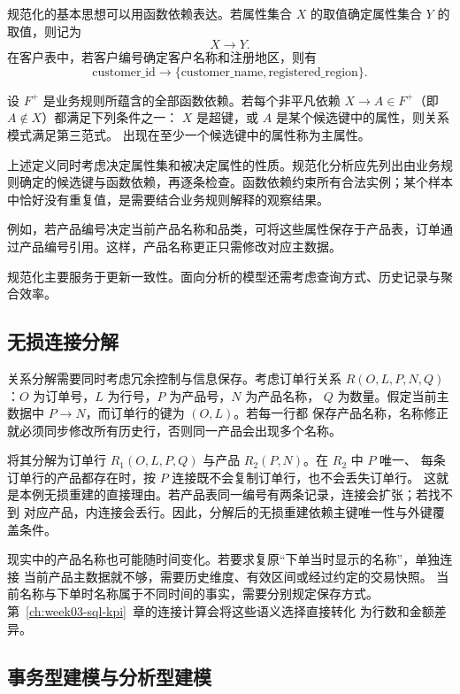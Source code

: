 规范化的基本思想可以用函数依赖表达。若属性集合 \(X\) 的取值确定属性集合 \(Y\) 的取值，则记为
\[
X\rightarrow Y.
\]
在客户表中，若客户编号确定客户名称和注册地区，则有
\[
\text{customer\_id}\rightarrow
\{\text{customer\_name},\text{registered\_region}\}.
\]

\begin{definition}[第三范式]
设 \(F^+\) 是业务规则所蕴含的全部函数依赖。若每个非平凡依赖
\(X\to A\in F^+\)（即 \(A\notin X\)）都满足下列条件之一：
\(X\) 是超键，或 \(A\) 是某个候选键中的属性，则关系模式满足第三范式。
出现在至少一个候选键中的属性称为主属性。
\end{definition}

上述定义同时考虑决定属性集和被决定属性的性质。规范化分析应先列出由业务规则确定的候选键与函数依赖，再逐条检查。函数依赖约束所有合法实例；某个样本中恰好没有重复值，是需要结合业务规则解释的观察结果。

例如，若产品编号决定当前产品名称和品类，可将这些属性保存于产品表，订单通过产品编号引用。这样，产品名称更正只需修改对应主数据。

规范化主要服务于更新一致性。面向分析的模型还需考虑查询方式、历史记录与聚合效率。

\subsection{无损连接分解}
关系分解需要同时考虑冗余控制与信息保存。考虑订单行关系
\(R(O,L,P,N,Q)\)：\(O\) 为订单号，\(L\) 为行号，\(P\) 为产品号，\(N\) 为产品名称，
\(Q\) 为数量。假定当前主数据中 \(P\to N\)，而订单行的键为 \((O,L)\)。若每一行都
保存产品名称，名称修正就必须同步修改所有历史行，否则同一产品会出现多个名称。

将其分解为订单行 \(R_1(O,L,P,Q)\) 与产品 \(R_2(P,N)\)。在 \(R_2\) 中 \(P\) 唯一、
每条订单行的产品都存在时，按 \(P\) 连接既不会复制订单行，也不会丢失订单行。
这就是本例无损重建的直接理由。若产品表同一编号有两条记录，连接会扩张；若找不到
对应产品，内连接会丢行。因此，分解后的无损重建依赖主键唯一性与外键覆盖条件。

现实中的产品名称也可能随时间变化。若要求复原“下单当时显示的名称”，单独连接
当前产品主数据就不够，需要历史维度、有效区间或经过约定的交易快照。
当前名称与下单时名称属于不同时间的事实，需要分别规定保存方式。
第~\ref{ch:week03-sql-kpi}~章的连接计算会将这些语义选择直接转化
为行数和金额差异。

\subsection{事务型建模与分析型建模}

